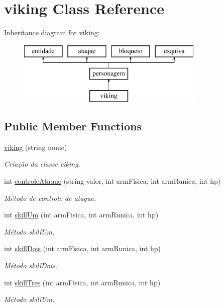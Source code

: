 \hypertarget{classviking}{}\section{viking Class Reference}
\label{classviking}
Inheritance diagram for viking\+:\begin{figure}[H]
\begin{center}
\leavevmode
\includegraphics[height=3.000000cm]{classviking}
\end{center}
\end{figure}
\subsection*{Public Member Functions}
\begin{DoxyCompactItemize}
\item 
\mbox{\hyperlink{classviking_aec7e94a062284984afac0ffc49ea5213}{viking}} (string nome)
\begin{DoxyCompactList}\small\item\em Criação da classe viking. \end{DoxyCompactList}\item 
int \mbox{\hyperlink{classviking_aba7bbd831d9b38d98b74ca805d2ea250}{controle\+Ataque}} (string valor, int arm\+Fisica, int arm\+Runica, int hp)
\begin{DoxyCompactList}\small\item\em Método de controle de ataque. \end{DoxyCompactList}\item 
int \mbox{\hyperlink{classviking_a433998767ad855cbfa152c1b0f32363e}{skill\+Um}} (int arm\+Fisica, int arm\+Runica, int hp)
\begin{DoxyCompactList}\small\item\em Método skill\+Um. \end{DoxyCompactList}\item 
int \mbox{\hyperlink{classviking_a5d9d645dae5e647b668c57afa0be1cd8}{skill\+Dois}} (int arm\+Fisica, int arm\+Runica, int hp)
\begin{DoxyCompactList}\small\item\em Método skill\+Dois. \end{DoxyCompactList}\item 
int \mbox{\hyperlink{classviking_a68c634c68c727ebd2638965b6d393f42}{skill\+Tres}} (int arm\+Fisica, int arm\+Runica, int hp)
\begin{DoxyCompactList}\small\item\em Método skill\+Um. \end{DoxyCompactList}\end{DoxyCompactItemize}


